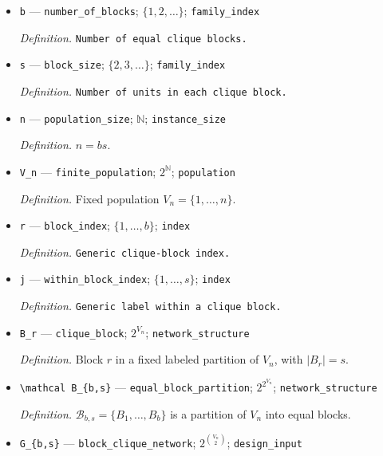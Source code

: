 \documentclass{article}
\begin{document}
\begin{itemize}
  \item \texttt{b} --- \texttt{number\_\allowbreak{}of\_\allowbreak{}blocks}; \(\{1,2,\ldots\}\); \texttt{family\_\allowbreak{}index}
  \par\smallskip\noindent\emph{Definition.} \texttt{Number of equal clique blocks.}
  \item \texttt{s} --- \texttt{block\_\allowbreak{}size}; \(\{2,3,\ldots\}\); \texttt{family\_\allowbreak{}index}
  \par\smallskip\noindent\emph{Definition.} \texttt{Number of units in each clique block.}
  \item \texttt{n} --- \texttt{population\_\allowbreak{}size}; \(\mathbb N\); \texttt{instance\_\allowbreak{}size}
  \par\smallskip\noindent\emph{Definition.} \(n=bs\).
  \item \texttt{V\_\allowbreak{}n} --- \texttt{finite\_\allowbreak{}population}; \(2^{\mathbb N}\); \texttt{population}
  \par\smallskip\noindent\emph{Definition.} Fixed population \(V_n=\{1,\ldots,n\}\).
  \item \texttt{r} --- \texttt{block\_\allowbreak{}index}; \(\{1,\ldots,b\}\); \texttt{index}
  \par\smallskip\noindent\emph{Definition.} \texttt{Generic clique-\allowbreak{}block index.}
  \item \texttt{j} --- \texttt{within\_\allowbreak{}block\_\allowbreak{}index}; \(\{1,\ldots,s\}\); \texttt{index}
  \par\smallskip\noindent\emph{Definition.} \texttt{Generic label within a clique block.}
  \item \texttt{B\_\allowbreak{}r} --- \texttt{clique\_\allowbreak{}block}; \(2^{V_n}\); \texttt{network\_\allowbreak{}structure}
  \par\smallskip\noindent\emph{Definition.} Block \(r\) in a fixed labeled partition of \(V_n\), with \(|B_r|=s\).
  \item \texttt{\textbackslash{}\allowbreak{}mathcal B\_\allowbreak{}\{b,\allowbreak{}s\}\allowbreak{}} --- \texttt{equal\_\allowbreak{}block\_\allowbreak{}partition}; \(2^{2^{V_n}}\); \texttt{network\_\allowbreak{}structure}
  \par\smallskip\noindent\emph{Definition.} \(\mathcal B_{b,s}=\{B_1,\ldots,B_b\}\) is a partition of \(V_n\) into equal blocks.
  \item \texttt{G\_\allowbreak{}\{b,\allowbreak{}s\}\allowbreak{}} --- \texttt{block\_\allowbreak{}clique\_\allowbreak{}network}; \(2^{\binom{V_n}{2}}\); \texttt{design\_\allowbreak{}input}

\end{itemize}
\end{document}
